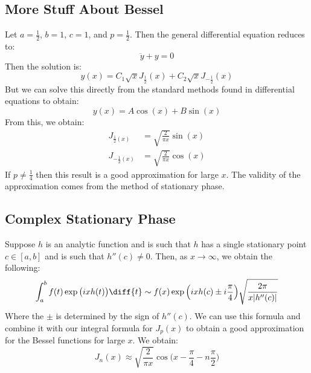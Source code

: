 \documentclass[crop=false,class=book,oneside]{standalone}
\begin{document}
        \subsection{More Stuff About Bessel}
            Let $a=\frac{1}{2}$, $b=1$, $c=1$,
            and $p=\frac{1}{2}$. Then the general differential
            equation reduces to:
            \begin{equation}
                \ddot{y}+y=0
            \end{equation}
            Then the solution is:
            \begin{equation}
                y(x)=C_{1}\sqrt{x}J_{\frac{1}{2}}(x)+
                    C_{2}\sqrt{x}J_{\minus\frac{1}{2}}(x)
            \end{equation}
            But we can solve this directly from the standard
            methods found in differential equations to obtain:
            \begin{equation}
                y(x)=A\cos(x)+B\sin(x)
            \end{equation}
            From this, we obtain:
            \begin{align}
                J_{\frac{1}{2}(x)}
                    &=\sqrt{\frac{2}{\pi{x}}}\sin(x)\\
                J_{\minus\frac{1}{2}(x)}
                    &=\sqrt{\frac{2}{\pi{x}}}\cos(x)
            \end{align}
            If $p\ne\frac{1}{4}$ then this result is a good
            approximation for large $x$. The validity of the
            approximation comes from the method of stationary
            phase.
        \subsection{Complex Stationary Phase}
            Suppose $h$ is an analytic function and is such
            that $h$ has a single stationary point
            $c\in[a,b]$ and is such that $h''(c)\ne{0}$.
            Then, as $x\rightarrow\infty$, we obtain the following:
            \begin{equation}
                \int_{a}^{b}f(t)\exp\big(ixh(t)\big)\diff{t}
                \sim{f}(x)\exp\Big(ixh(c)\pm{i}\frac{\pi}{4}\Big)
                    \sqrt{\frac{2\pi}{x|h''(c)|}}
            \end{equation}
            Where the $\pm$ is determined by the sign of
            $h''(c)$. We can use this formula and combine it with
            our integral formula for $J_{p}(x)$ to obtain a good
            approximation for the Bessel functions for large $x$.
            We obtain:
            \begin{equation}
                J_{n}(x)\approx
                \sqrt{\frac{2}{\pi{x}}}
                \cos\Big(x-\frac{\pi}{4}-n\frac{\pi}{2}\Big)
            \end{equation}
\end{document}
